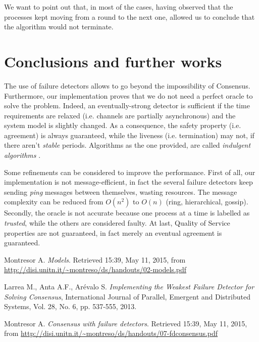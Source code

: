 \documentclass[a4paper]{article}
\begin{document}
We want to point out that, in most of the cases, having observed that the processes kept moving from a round to the next one, allowed us to conclude that the algorithm would not terminate.


\section{Conclusions and further works}
\label{sec:conclusions}

The use of failure detectors allows to go beyond the impossibility of Consensus. Furthermore, our implementation proves that we do not need a perfect oracle to solve the problem. Indeed, an eventually-strong detector is sufficient if the time requirements are relaxed (i.e. channels are partially asynchronous) and the system model is slightly changed. As a consequence, the safety property (i.e. agreement) is always guaranteed, while the liveness (i.e. termination) may not, if there aren't \emph{stable} periods.
Algorithms as the one provided, are called \emph{indulgent algorithms} \cite{fdconsensus}.

Some refinements can be considered to improve the performance. First of all, our implementation is not message-efficient, in fact the several failure detectors keep sending \emph{ping} messages between themselves, wasting resources. The message complexity can be reduced from $O(n^2)$ to $O(n)$ (ring, hierarchical, gossip).
Secondly, the oracle is not accurate because one process at a time is labelled as \emph{trusted}, while the others are considered faulty.
At last, Quality of Service properties are not guaranteed, in fact merely an eventual agreement is guaranteed.




\begin{thebibliography}{5}

 Montresor A.
\textit{Models}. Retrieved 15:39, May 11, 2015, from
\url{http://disi.unitn.it/~montreso/ds/handouts/02-models.pdf}

 Larrea M., Anta A.F., Ar\'evalo S.
\textit{Implementing the Weakest Failure Detector for Solving Consensus}, International Journal of Parallel, Emergent and Distributed Systems, Vol. 28, No. 6, pp. 537-555, 2013.

 Montresor A.
\textit{Consensus with failure detectors}. Retrieved 15:39, May 11, 2015, from
\url{http://disi.unitn.it/~montreso/ds/handouts/07-fdconsensus.pdf}

\end{thebibliography}
\end{document}
